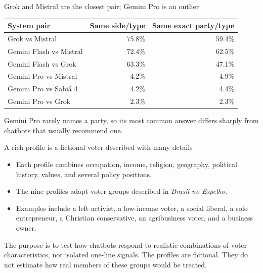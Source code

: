 \documentclass[aspectratio=169,11pt]{beamer}
\newcommand{\source}[1]{\vfill{\fontsize{8}{10}\selectfont\color{muted}#1}}
\begin{document}
\begin{frame}{Grok and Mistral are the closest pair; Gemini Pro is an outlier}
\small
\begin{tabular}{lrr}\toprule
\textbf{System pair}&\textbf{Same side/type}&\textbf{Same exact party/type}\\\midrule
Grok vs Mistral&75.8\%&59.4\%\\
Gemini Flash vs Mistral&72.4\%&62.5\%\\
Gemini Flash vs Grok&63.3\%&47.1\%\\\midrule
Gemini Pro vs Mistral&4.2\%&4.9\%\\
Gemini Pro vs Sabi\'a 4&4.2\%&4.4\%\\
Gemini Pro vs Grok&2.3\%&2.3\%\\\bottomrule
\end{tabular}\par
\vspace{.3cm}
Gemini Pro rarely names a party, so its most common answer differs sharply from chatbots that usually recommend one.
\end{frame}

\begin{frame}{A rich profile is a fictional voter described with many details}
\begin{itemize}
\item Each profile combines occupation, income, religion, geography, political history, values, and several policy positions.
\item The nine profiles adapt voter groups described in \textit{Brasil no Espelho}.
\item Examples include a left activist, a low-income voter, a social liberal, a solo entrepreneur, a Christian conservative, an agribusiness voter, and a business owner.
\end{itemize}
\vspace{.25cm}
The purpose is to test how chatbots respond to realistic combinations of voter characteristics, not isolated one-line signals.
\source{The profiles are fictional. They do not estimate how real members of these groups would be treated.}
\end{frame}
\end{document}
